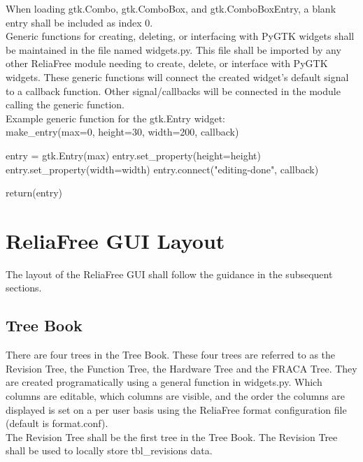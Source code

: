 \documentclass[11pt, 12pt, twoside, onecolumn]{article}
\begin{document}
\noindent When loading gtk.Combo, gtk.ComboBox, and gtk.ComboBoxEntry, a blank entry shall be included as index 0. \\

\noindent Generic functions for creating, deleting, or interfacing with PyGTK widgets shall be maintained in the file named widgets.py.  This file shall be imported by any other ReliaFree module needing to create, delete, or interface with PyGTK widgets.  These generic functions will connect the created widget's default signal to a callback function.  Other signal/callbacks will be connected in the module calling the generic function. \\

\noindent Example generic function for the gtk.Entry widget: \\

        make\_entry(max=0, height=30, width=200, callback)

            entry = gtk.Entry(max)
            entry.set\_property(height=height)
            entry.set\_property(width=width)
            entry.connect("editing-done", callback)

            return(entry)

\section{\bf \Large ReliaFree GUI Layout}

\noindent The layout of the ReliaFree GUI shall follow the guidance in the subsequent sections.

\subsection{\bf \large Tree Book}

\noindent There are four trees in the Tree Book.  These four trees are referred to as the Revision Tree, the Function Tree, the Hardware Tree and the FRACA Tree.  They are created programatically using a general function in widgets.py.  Which columns are editable, which columns are visible, and the order the columns are displayed is set on a per user basis using the ReliaFree format configuration file (default is format.conf). \\

\noindent The Revision Tree shall be the first tree in the Tree Book.  The Revision Tree shall be used to locally store tbl\_revisions data. \\
\end{document}
